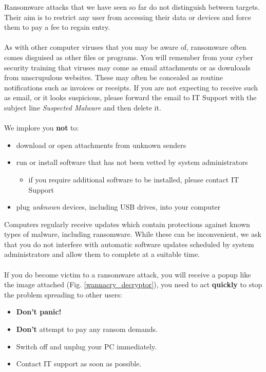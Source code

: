 \documentclass{article}
\begin{document}
Ransomware attacks that we have seen so far do not distinguish between targets. Their aim is to restrict any user from accessing their data or devices and force them to pay a fee to regain entry.
\\\\
As with other computer viruses that you may be aware of, ransomware often comes disguised as other files or programs. You will remember from your cyber security training that viruses may come as email attachments or as downloads from unscrupulous websites. These may often be concealed as routine notifications such as invoices or receipts. If you are not expecting to receive such as email, or it looks suspicious, please forward the email to IT Support with the subject line \textit{Suspected Malware} and then delete it.
\\\\
We implore you \textbf{not} to:
\begin{itemize}
	\item download or open attachments from unknown senders
	\item run or install software that has not been vetted by system administrators
		\begin{itemize}
			\item if you require additional software to be installed, please contact IT Support
		\end{itemize}
	\item plug \textit{unknown} devices, including USB drives, into your computer
\end{itemize}

Computers regularly receive updates which contain protections against known types of malware, including ransomware.
While these can be inconvenient, we ask that you do not interfere with automatic software updates scheduled by system administrators and allow them to complete at a suitable time.
\\\\
If you do become victim to a ransomware attack, you will receive a popup like the image attached (Fig. \ref{wannacry_decryptor}), you need to act \textbf{quickly} to stop the problem spreading to other users:
\begin{itemize}
	\item \textbf{Don't panic!}
	\item \textbf{Don't} attempt to pay any ransom demands.
	\item Switch off and unplug your PC immediately.
	\item Contact IT support as soon as possible.
\end{itemize}
\end{document}
